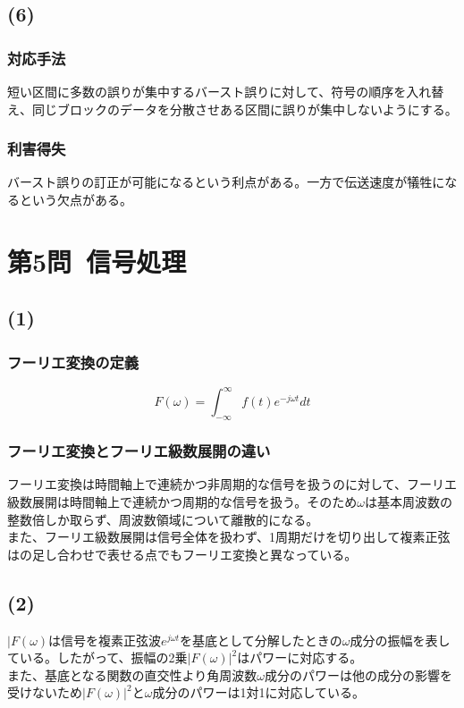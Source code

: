 \documentclass[a4paper,12pt,xelatex,ja=standard]{bxjsarticle}
\begin{document}
\subsection*{(6)}
\subsubsection*{対応手法}
短い区間に多数の誤りが集中するバースト誤りに対して、符号の順序を入れ替え、同じブロックのデータを分散させある区間に誤りが集中しないようにする。

\subsubsection*{利害得失}
バースト誤りの訂正が可能になるという利点がある。一方で伝送速度が犠牲になるという欠点がある。

\section*{第5問\ 信号処理}
\subsection*{(1)}
\subsubsection*{フーリエ変換の定義}
\[
  F(\omega) = \int^{\infty}_{-\infty}f(t)e^{-j \omega t}dt
\]

\subsubsection*{フーリエ変換とフーリエ級数展開の違い}
フーリエ変換は時間軸上で連続かつ非周期的な信号を扱うのに対して、フーリエ級数展開は時間軸上で連続かつ周期的な信号を扱う。そのため$\omega$は基本周波数の整数倍しか取らず、周波数領域について離散的になる。\\
また、フーリエ級数展開は信号全体を扱わず、1周期だけを切り出して複素正弦はの足し合わせで表せる点でもフーリエ変換と異なっている。

\subsection*{(2)}
$|F(\omega)$は信号を複素正弦波$e^{j \omega t}$を基底として分解したときの$\omega$成分の振幅を表している。したがって、振幅の2乗$|F(\omega)|^2$はパワーに対応する。\\
また、基底となる関数の直交性より角周波数$\omega$成分のパワーは他の成分の影響を受けないため$|F(\omega)|^2$と$\omega$成分のパワーは1対1に対応している。
\end{document}
